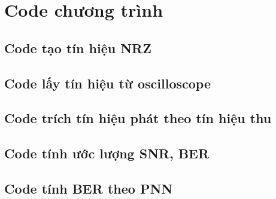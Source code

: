 \chapter{Code chương trình}

\section{Code tạo tín hiệu NRZ}



\section{Code lấy tín hiệu từ oscilloscope}



\section{Code trích tín hiệu phát theo tín hiệu thu}



\section{Code tính ước lượng SNR, BER}



\section{Code tính BER theo PNN}






